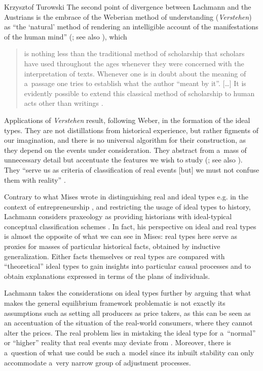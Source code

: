 \begin{artengenv}{Krzysztof Turowski}
The second point of divergence between Lachmann and the Austrians is the embrace of the Weberian method of understanding (\emph{Verstehen}) as ``the `natural' method of rendering an intelligible account of the manifestations of the human mind'' (\cite[17--18]{lachmann-weber}; see also \cite[47]{lachmann-significance}), which
\begin{quote}
is nothing less than the traditional method of scholarship that scholars have used throughout the ages whenever they were concerned with the interpretation of texts. Whenever one is in doubt about the meaning of a~passage one tries to establish what the author ``meant by it''.
[\ldots] It is evidently possible to extend this classical method of scholarship to human acts other than writings \parencite[10]{lachmann-weber}.
\end{quote}

Applications of \emph{Verstehen} result, following Weber, in the formation of the ideal types.
They are not distillations from historical experience, but rather figments of our imagination, and there is no universal algorithm for their construction, as they depend on the events under consideration.
They abstract from a~mass of unnecessary detail but accentuate the features we wish to study (\cite[26--27]{lachmann-weber}; see also \cite[90]{weber}). They ``serve us as criteria of classification of real events [but] we must not confuse them with reality'' \parencite[254]{lachmann-legislation}.

Contrary to what Mises wrote in distinguishing real and ideal types e.g. in the context of entrepreneurship \parencite[59--64, 252--256]{mises-ha}, and restricting the usage of ideal types to history, Lachmann considers praxeology as providing historians with ideal-typical conceptual classification schemes \parencite[34--35]{lachmann1986market}.
In fact, his perspective on ideal and real types is almost the opposite of what we can see in Mises: real types here serve as proxies for masses of particular historical facts, obtained by inductive generalization. Either facts themselves or real types are compared with ``theoretical'' ideal types to gain insights into particular causal processes and to obtain explanations expressed in terms of the plans of individuals.

Lachmann takes the considerations on ideal types further by arguing that what makes the general equilibrium framework problematic is not exactly its assumptions such as setting all producers as price takers, as this can be seen as an accentuation of the situation of the real-world consumers, where they cannot alter the prices.
The real problem lies in mistaking the ideal type for a~``normal'' or ``higher'' reality that real events may deviate from \parencite[37]{lachmann1986market}. Moreover, there is a~question of what use could be such a~model since its inbuilt stability can only accommodate a~very narrow group of adjustment processes.


\end{artengenv}
